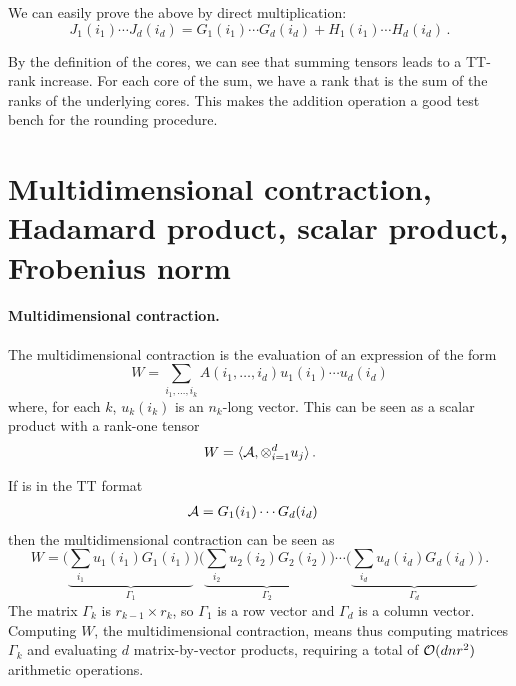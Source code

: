 We can easily prove the above by direct multiplication:
\begin{equation*}
  J_1(i_1) \cdots J_d(i_d) = G_1(i_1) \cdots G_d(i_d) + H_1(i_1) \cdots H_d(i_d)\, .
\end{equation*}

By the definition of the cores, we can see that summing tensors leads to a TT-rank increase. For each core of the sum, we have a rank that is the sum of the ranks of the underlying cores. This makes the addition operation a good test bench for the rounding procedure.

\section[Contraction, products and norm]{Multidimensional contraction, Hadamard product, scalar product, Frobenius norm}
\paragraph{Multidimensional contraction.}
The multidimensional contraction is the evaluation of an expression of the form
\begin{equation*}
  W = \sum_{i_1,\ldots,i_k} A(i_1,\ldots,i_d) u_1(i_1) \cdots u_d(i_d)
\end{equation*}
where, for each $k$, $u_k(i_k)$ is an $n_k$-long vector. This can be seen as a scalar product with a rank-one tensor
\begin{equation*}
  W = \langle \mathcal{A}, \otimes_{i=1}^d u_j \rangle\, .
\end{equation*}

If \A is in the TT format
\begin{equation*}
  \begin{split}
    \mathcal{A} &= G_1(i_1) \cdots G_d(i_d)
  \end{split}
\end{equation*}
then the multidimensional contraction can be seen as
\begin{equation*}
  W = \Bigg( \underbrace{\sum_{i_1} u_1(i_1)G_1(i_1)}_{\Gamma_1} \Bigg) \Bigg( \underbrace{ \sum_{i_2} u_2(i_2)G_2(i_2)}_{\Gamma_2} \Bigg) \cdots \Bigg( \underbrace{\sum_{i_d} u_d(i_d)G_d(i_d)}_{\Gamma_d} \Bigg)\, .
\end{equation*}
The matrix $\Gamma_k$ is $r_{k-1} \times r_k$, so $\Gamma_1$ is a row vector and $\Gamma_d$ is a column vector. Computing $W$, the multidimensional contraction, means thus computing matrices $\Gamma_k$ and evaluating $d$ matrix-by-vector products, requiring a total of $\mathcal{O}(dnr^2)$ arithmetic operations.

